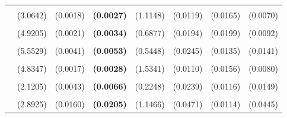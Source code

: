 \documentclass[
  12pt,
]{article}
\begin{document}
\begin{table}[H]
{\begin{tabular}[t]{lll>{}lllll}
\addlinespace
\cellcolor{gray!6}{c.hamilton28.panelr20} & \cellcolor{gray!6}{-139.0052} & \cellcolor{gray!6}{0.7134} & \textbf{\cellcolor{gray!6}{0.6272}} & \cellcolor{gray!6}{10.5537} & \cellcolor{gray!6}{0.3910} & \cellcolor{gray!6}{0.3042} & \cellcolor{gray!6}{0.2458}\\
 & (3.0642) & (0.0018) & \textbf{(0.0027)} & (1.1148) & (0.0119) & (0.0165) & (0.0070)\\
\addlinespace
\cellcolor{gray!6}{c.hamilton13.panel} & \cellcolor{gray!6}{-123.8627} & \cellcolor{gray!6}{0.6894} & \textbf{\cellcolor{gray!6}{0.6220}} & \cellcolor{gray!6}{5.1997} & \cellcolor{gray!6}{0.4206} & \cellcolor{gray!6}{0.3132} & \cellcolor{gray!6}{0.2757}\\
 & (4.9205) & (0.0021) & \textbf{(0.0034)} & (0.6877) & (0.0194) & (0.0199) & (0.0092)\\
\addlinespace
\cellcolor{gray!6}{c.hamilton28.panelr15} & \cellcolor{gray!6}{-132.7462} & \cellcolor{gray!6}{0.7052} & \textbf{\cellcolor{gray!6}{0.6217}} & \cellcolor{gray!6}{11.6613} & \cellcolor{gray!6}{0.3874} & \cellcolor{gray!6}{0.3127} & \cellcolor{gray!6}{0.2486}\\
 & (5.5529) & (0.0041) & \textbf{(0.0053)} & (0.5448) & (0.0245) & (0.0135) & (0.0141)\\
\addlinespace
\cellcolor{gray!6}{c.linear} & \cellcolor{gray!6}{-106.5647} & \cellcolor{gray!6}{0.6846} & \textbf{\cellcolor{gray!6}{0.6158}} & \cellcolor{gray!6}{4.0160} & \cellcolor{gray!6}{0.4621} & \cellcolor{gray!6}{0.3113} & \cellcolor{gray!6}{0.3108}\\
 & (4.8347) & (0.0017) & \textbf{(0.0028)} & (1.5341) & (0.0110) & (0.0156) & (0.0080)\\
\addlinespace
\cellcolor{gray!6}{c.bn2.r20} & \cellcolor{gray!6}{-76.7863} & \cellcolor{gray!6}{0.6908} & \textbf{\cellcolor{gray!6}{0.6137}} & \cellcolor{gray!6}{0.2458} & \cellcolor{gray!6}{0.4327} & \cellcolor{gray!6}{0.3208} & \cellcolor{gray!6}{0.2907}\\
 & (2.1205) & (0.0043) & \textbf{(0.0066)} & (0.2248) & (0.0239) & (0.0116) & (0.0149)\\
\addlinespace
\cellcolor{gray!6}{c.bn6.r20} & \cellcolor{gray!6}{-86.4636} & \cellcolor{gray!6}{0.6757} & \textbf{\cellcolor{gray!6}{0.5987}} & \cellcolor{gray!6}{0.2144} & \cellcolor{gray!6}{0.4713} & \cellcolor{gray!6}{0.3231} & \cellcolor{gray!6}{0.3286}\\
 & (2.8925) & (0.0160) & \textbf{(0.0205)} & (1.1466) & (0.0471) & (0.0114) & (0.0445)\\

\end{tabular}}
\end{table}
\end{document}
